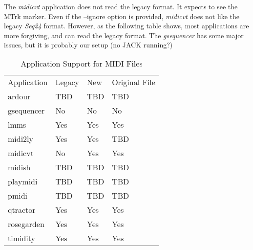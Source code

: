    The \textsl{midicvt} application does not read the legacy format.  It
   expects to see the MTrk marker.  Even if the --ignore option is provided,
   \textsl{midicvt} does not like the legacy \textsl{Seq24} format.
   However, as the following table shows, most applications are more
   forgiving, and can read the legacy format.  The \textsl{gsequencer} has
   some major issues, but it is probably our setup (no JACK running?)

   \begin{table}
      \caption{Application Support for MIDI Files}
      \label{table:midi_file_support_table}
      \begin{tabular}{l l l l}
         Application  & Legacy    & New       & Original File \\
         ardour       & TBD       & TBD       & TBD \\
         gsequencer   & No        & No        & No \\
         lmms         & Yes       & Yes       & Yes \\
         midi2ly      & Yes       & Yes       & TBD \\
         midicvt      & No        & Yes       & Yes \\
         midish       & TBD       & TBD       & TBD \\
         playmidi     & TBD       & TBD       & TBD \\
         pmidi        & TBD       & TBD       & TBD \\
         qtractor     & Yes       & Yes       & Yes \\
         rosegarden   & Yes       & Yes       & Yes \\
         timidity     & Yes       & Yes       & Yes \\
      \end{tabular}
   \end{table}

